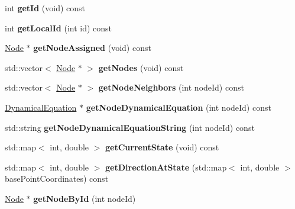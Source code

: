\begin{DoxyCompactItemize}
\item 
int {\bfseries get\+Id} (void) const \hypertarget{classNetwork_ae30196d51c9db40feaf93cde5508d106}{}\label{classNetwork_ae30196d51c9db40feaf93cde5508d106}

\item 
int {\bfseries get\+Local\+Id} (int id) const \hypertarget{classNetwork_a0b1b879abf7417e425325999a7919d15}{}\label{classNetwork_a0b1b879abf7417e425325999a7919d15}

\item 
\hyperlink{classNode}{Node} $\ast$ {\bfseries get\+Node\+Assigned} (void) const \hypertarget{classNetwork_a0c67b1e20e97cff7dedb84571936fd0b}{}\label{classNetwork_a0c67b1e20e97cff7dedb84571936fd0b}

\item 
std\+::vector$<$ \hyperlink{classNode}{Node} $\ast$ $>$ {\bfseries get\+Nodes} (void) const \hypertarget{classNetwork_afb787c0243504190c513013ca198e947}{}\label{classNetwork_afb787c0243504190c513013ca198e947}

\item 
std\+::vector$<$ \hyperlink{classNode}{Node} $\ast$ $>$ {\bfseries get\+Node\+Neighbors} (int node\+Id) const \hypertarget{classNetwork_afe7437019956a4677ef9d4df98c36730}{}\label{classNetwork_afe7437019956a4677ef9d4df98c36730}

\item 
\hyperlink{classDynamicalEquation}{Dynamical\+Equation} $\ast$ {\bfseries get\+Node\+Dynamical\+Equation} (int node\+Id) const \hypertarget{classNetwork_aecfd002e55cef6a23843d535e75f49e0}{}\label{classNetwork_aecfd002e55cef6a23843d535e75f49e0}

\item 
std\+::string {\bfseries get\+Node\+Dynamical\+Equation\+String} (int node\+Id) const \hypertarget{classNetwork_a69e8e7ddd08590f496eeb38d28e5f8dd}{}\label{classNetwork_a69e8e7ddd08590f496eeb38d28e5f8dd}

\item 
std\+::map$<$ int, double $>$ {\bfseries get\+Current\+State} (void) const \hypertarget{classNetwork_aa5727c4eb316f69edae5efee422d5c6a}{}\label{classNetwork_aa5727c4eb316f69edae5efee422d5c6a}

\item 
std\+::map$<$ int, double $>$ {\bfseries get\+Direction\+At\+State} (std\+::map$<$ int, double $>$ base\+Point\+Coordinates) const \hypertarget{classNetwork_a140759419ddad1c7dea5537e90c52572}{}\label{classNetwork_a140759419ddad1c7dea5537e90c52572}

\item 
\hyperlink{classNode}{Node} $\ast$ {\bfseries get\+Node\+By\+Id} (int node\+Id)\hypertarget{classNetwork_a0b983325b6f616ab86591f1a5c6b0d69}{}\label{classNetwork_a0b983325b6f616ab86591f1a5c6b0d69}

\end{DoxyCompactItemize}
